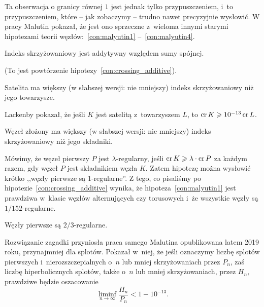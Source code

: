 Ta obserwacja o granicy równej $1$ jest jednak tylko przypuszczeniem, i~to przypuszczeniem, które -- jak zobaczymy -- trudno nawet precyzyjnie wysłowić.
W pracy \cite{malyutin2016} Malutin pokazał, że jest ono sprzeczne z~wieloma innymi starymi hipotezami teorii węzłów:~\ref{con:malyutin1} --~\ref{con:malyutin4}.
%

\begin{conjecture}
\label{con:malyutin1}%
    Indeks skrzyżowaniowy jest addytywny względem sumy spójnej.
%
%
\end{conjecture}

(To jest powtórzenie hipotezy~\ref{con:crossing_additive}).

\begin{conjecture}
    Satelita ma większy (w słabszej wersji: nie mniejszy) indeks skrzyżowaniowy niż jego towarzysze.
\end{conjecture}

Lackenby \cite{lackenby2014} pokazał, że jeśli $K$ jest satelitą z~towarzyszem $L$, to $\operatorname{cr} K \geqslant 10^{-13} \operatorname{cr} L$.
%

\begin{conjecture}
    Węzeł złożony ma większy (w słabszej wersji: nie mniejszy) indeks skrzyżowaniowy niż jego składniki.
\end{conjecture}

Mówimy, że węzeł pierwszy $P$ jest $\lambda$-regularny, jeśli $\operatorname{cr} K \geqslant \lambda \cdot \operatorname{cr} P$ za każdym razem, gdy węzeł $P$ jest składnikiem węzła $K$.
Zatem hipotezę można wysłowić krótko ,,węzły pierwsze są $1$-regularne''.
Z tego, co pisaliśmy po hipotezie~\ref{con:crossing_additive} wynika, że hipoteza~\ref{con:malyutin1} jest prawdziwa w~klasie węzłów alternujących czy torusowych i~że wszystkie węzły są $1/152$-regularne.

\begin{conjecture}
    \label{con:malyutin4}
    Węzły pierwsze są $2/3$-regularne.
\end{conjecture}

Rozwiązanie zagadki przyniosła praca samego Malutina \cite{malyutin2019} opublikowana latem 2019 roku, przynajmniej dla splotów.
%
Pokazał w~niej, że jeśli oznaczymy liczbę splotów pierwszych i~nierozszczepialnych o~$n$ lub mniej skrzyżowaniach przez $P_n$, zaś liczbę hiperbolicznych splotów, także o~$n$ lub mniej skrzyżowaniach, przez $H_n$, prawdziwe będzie oszacowanie
\begin{equation}
    \liminf_{n \to \infty} \frac{H_n}{P_n} < 1 - 10^{-13}.
\end{equation}

